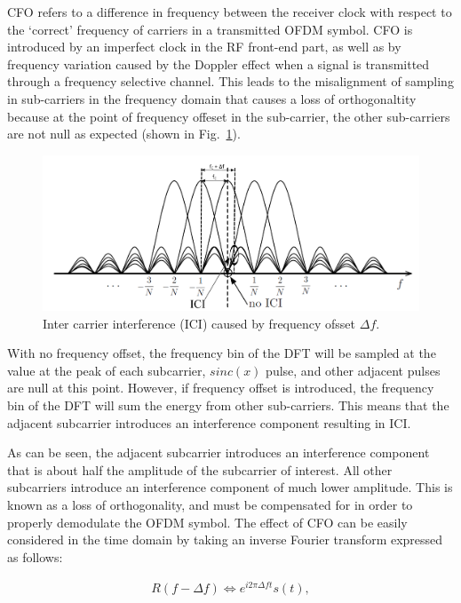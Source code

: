 CFO refers to a difference in frequency between the receiver clock with respect to the `correct' frequency of carriers in a transmitted OFDM symbol. 
CFO is introduced by an imperfect clock in the RF front-end part, as well as by frequency variation caused by the Doppler effect when a signal is transmitted through a frequency selective channel. 
This leads to the misalignment of sampling in sub-carriers in the frequency domain that causes a loss of orthogonaltity because at the point of frequency offeset in the sub-carrier, the other sub-carriers are not null as expected (shown in Fig.~\ref{fig:OFDM-subcarrier-freoff}).


\begin{figure}
	\centerline{\includegraphics [width=0.8\columnwidth] {Figures/OFDM-subcarrier-freoff.pdf} }
	\caption{Inter carrier interference (ICI) caused by frequency ofsset $\Delta f$.}
	\label{fig:OFDM-subcarrier-freoff}
\end{figure}

With no frequency offset, the frequency bin of the DFT will be sampled at the value at the peak of each subcarrier, $sinc(x)$ pulse, and other adjacent pulses are null at this point. 
However, if frequency offset is introduced, the frequency bin of the DFT will sum the energy from other sub-carriers. 
This means that the adjacent subcarrier introduces an interference component resulting in ICI. 

As can be seen, the adjacent subcarrier introduces an interference component that is about half the amplitude of the subcarrier of interest. 
All other subcarriers introduce an interference component of much lower amplitude. 
This is known as a loss of orthogonality, and must be compensated for in order to properly demodulate the OFDM symbol.
The effect of CFO can be easily considered in the time domain by taking an inverse Fourier transform expressed as follows:

\begin{eqnarray}
\label{equ:}
             R(f - \Delta f) \Leftrightarrow  e^{i2\pi \Delta ft} s(t),
\end{eqnarray}	

